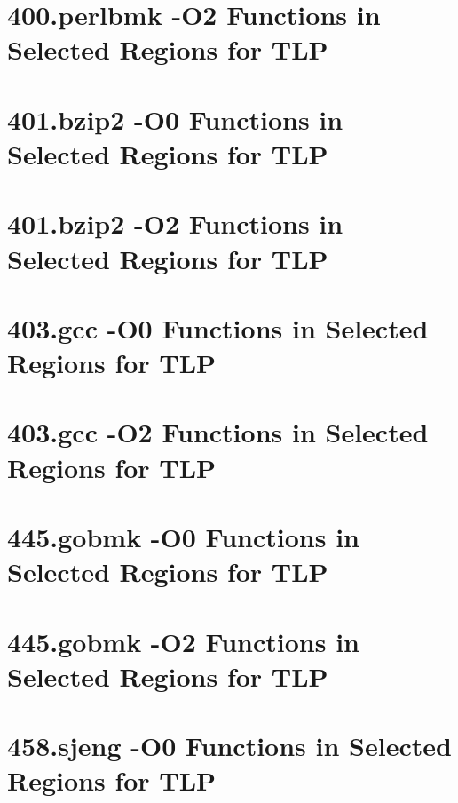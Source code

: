 \documentclass[defaultstyle,11pt]{thesis}
\begin{document}
\section{400.perlbmk -O2 Functions in Selected Regions for TLP}
        {\small
          
        }
                
\section{401.bzip2 -O0 Functions in Selected Regions for TLP}
        {\small
          
        }
                
\section{401.bzip2 -O2 Functions in Selected Regions for TLP}
        {\small
          
        }               

\section{403.gcc -O0 Functions in Selected Regions for TLP}
        {\small
                    
        }

\section{403.gcc -O2 Functions in Selected Regions for TLP}
        {\small
          
        }

\section{445.gobmk -O0 Functions in Selected Regions for TLP}
        {\small
          
        }

\section{445.gobmk -O2 Functions in Selected Regions for TLP}
        {\small
          
        }

\section{458.sjeng -O0 Functions in Selected Regions for TLP}
        {\small
          
        }
\end{document}

